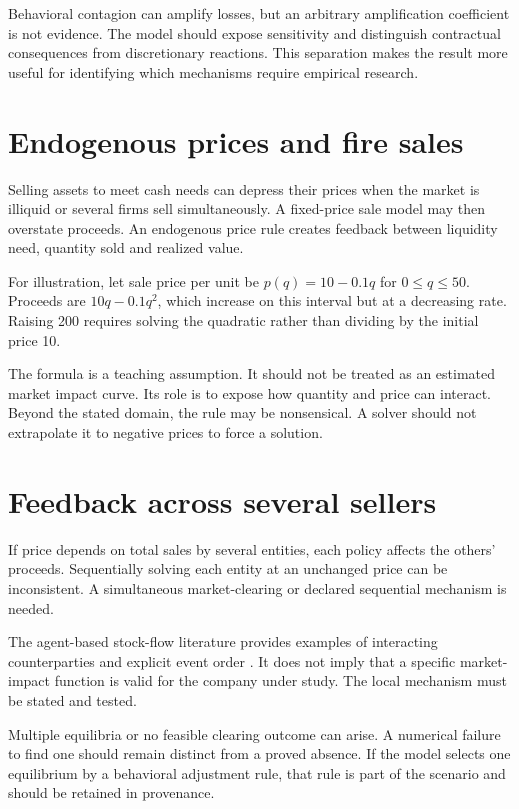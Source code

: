 Behavioral contagion can amplify losses, but an arbitrary amplification coefficient is not evidence. The model should expose sensitivity and distinguish contractual consequences from discretionary reactions. This separation makes the result more useful for identifying which mechanisms require empirical research.

\section{Endogenous prices and fire sales}
Selling assets to meet cash needs can depress their prices when the market is illiquid or several firms sell simultaneously. A fixed-price sale model may then overstate proceeds. An endogenous price rule creates feedback between liquidity need, quantity sold and realized value.

For illustration, let sale price per unit be $p(q)=10-0.1q$ for $0\leq q\leq50$. Proceeds are $10q-0.1q^2$, which increase on this interval but at a decreasing rate. Raising 200 requires solving the quadratic rather than dividing by the initial price 10.

The formula is a teaching assumption. It should not be treated as an estimated market impact curve. Its role is to expose how quantity and price can interact. Beyond the stated domain, the rule may be nonsensical. A solver should not extrapolate it to negative prices to force a solution.

\section{Feedback across several sellers}
If price depends on total sales by several entities, each policy affects the others' proceeds. Sequentially solving each entity at an unchanged price can be inconsistent. A simultaneous market-clearing or declared sequential mechanism is needed.

The agent-based stock-flow literature provides examples of interacting counterparties and explicit event order \citep{caiani2016}. It does not imply that a specific market-impact function is valid for the company under study. The local mechanism must be stated and tested.

Multiple equilibria or no feasible clearing outcome can arise. A numerical failure to find one should remain distinct from a proved absence. If the model selects one equilibrium by a behavioral adjustment rule, that rule is part of the scenario and should be retained in provenance.

